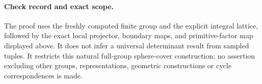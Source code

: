 \paragraph{Check record and exact scope.}
The proof uses the freshly computed finite group and the explicit
integral lattice, followed by the exact local projector, boundary
maps, and primitive-factor map displayed above. It does not infer a
universal determinant result from sampled tuples. It restricts this
natural full-group sphere-cover construction; no assertion excluding
other groups, representations, geometric constructions or cycle
correspondences is made.
